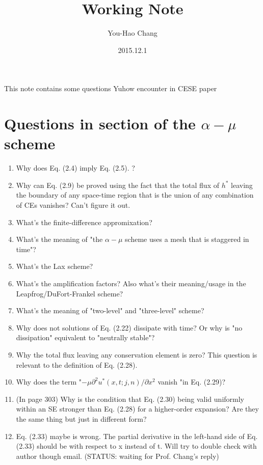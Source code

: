 \documentclass[a4paper,12pt,dvips]{article}
\begin{document}
\title{Working Note}
\author{You-Hao Chang}
\date{2015.12.1}

\maketitle

\tableofcontents

\hspace{.5cm}

This note contains some questions Yuhow encounter in CESE paper~\cite{CESE_Shin_Chung_Chang_1995}

\section{Questions in section of the $\alpha-\mu$ scheme}
 \begin{enumerate}
  \item Why does Eq. (2.4) imply Eq. (2.5). ?
  \item Why can Eq. (2.9) be proved using the fact that the total flux of $h^{*}$ leaving the boundary of any space-time region that is the union of any combination of CEs vanishes? Can't figure it out.
  \item What's the finite-difference appromixation?
  \item What's the meaning of "the $\alpha-\mu$ scheme uses a mesh that is staggered in time"?
  \item What's the Lax scheme?
  \item What's the amplification factors? Also what's their meaning/usage in the Leapfrog/DuFort-Frankel scheme?
  \item What's the meaning of "two-level" and "three-level" scheme?
  \item Why does not solutions of Eq. (2.22) dissipate with time? Or why is "no dissipation" equivalent to "neutrally stable"?
  \item Why the total flux leaving any conservation element is zero? This question is relevant to the definition of Eq. (2.28).
  \item Why does the term "$-\mu\partial^{2}u^{*}(x, t; j, n)/\partial x^{2} $ vanish "in Eq. (2.29)?
  \item (In page 303) Why is the condition that Eq. (2.30) being valid uniformly within an SE stronger than Eq. (2.28) for a higher-order expansion? Are they the same thing but just in different form?
  \item Eq. (2.33) maybe is wrong. The partial derivative in the left-hand side of Eq. (2.33) should be with respect to x instead of t. Will try to double check with author though email. (STATUS: waiting for Prof. Chang's reply)
 \end{enumerate}
\end{document}
